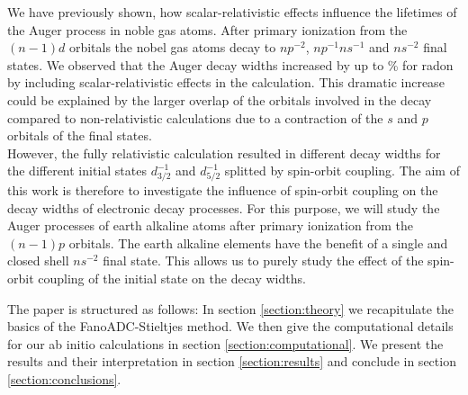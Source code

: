 We have previously shown, how
scalar-relativistic effects influence the lifetimes of the Auger process in
noble gas atoms. After primary ionization from the $(n-1)d$ orbitals the nobel
gas atoms decay to $np^{-2}$, $np^{-1}ns^{-1}$ and $ns^{-2}$ final states.
We observed that the Auger decay widths increased by up to \unit[326]{\%}
for radon
by including scalar-relativistic effects in the calculation. This
dramatic increase could be explained by the larger overlap of the orbitals
involved in the decay compared to non-relativistic calculations due to
a contraction of the $s$ and $p$ orbitals of the final states.\\
However, the fully relativistic calculation resulted in different decay widths
for the different initial states $d_{3/2}^{-1}$ and $d_{5/2}^{-1}$ splitted by
spin-orbit coupling. The aim of this work is therefore to investigate the
influence of spin-orbit coupling on the decay widths of electronic decay processes.
For this purpose, we will study the Auger processes of earth alkaline atoms
after primary ionization from the $(n-1)p$ orbitals. The earth alkaline elements
have the benefit of a single and closed shell $ns^{-2}$ final state.
This allows us to purely study the effect of the spin-orbit coupling of the
initial state on the decay widths.

The paper is structured as follows:
In section \ref{section:theory} we recapitulate the basics of the
FanoADC-Stieltjes method. We then give the computational details for our
ab initio calculations in section \ref{section:computational}. We present the
results and their interpretation in section \ref{section:results}
and conclude in section \ref{section:conclusions}.
